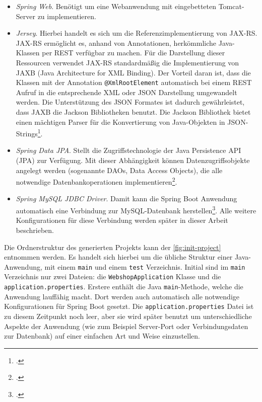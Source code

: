 \begin{itemize}
	\item \textit{Spring Web}. Benötigt um eine Webanwendung mit eingebetteten Tomcat-Server zu implementieren.
	\item \textit{Jersey}. Hierbei handelt es sich um die Referenzimplementierung von JAX-RS. JAX-RS ermöglicht es, anhand von Annotationen, herkömmliche Java-Klassen per REST verfügbar zu machen. Für die Darstellung dieser Ressourcen verwendet JAX-RS standardmäßig die Implementierung von \acs{JAXB} (Java Architecture for XML Binding). Der Vorteil daran ist, dass die Klassen mit der Annotation \texttt{@XmlRootElement} automatisch bei einem REST Aufruf in die entsprechende XML oder \acs{JSON} Darstellung umgewandelt werden. Die Unterstützung des JSON Formates ist dadurch gewährleistet, dass JAXB die Jackson Bibliotheken benutzt. Die Jackson Bibliothek bietet einen mächtigen Parser für die Konvertierung von Java-Objekten in JSON-Strings\footcite[Vgl.][]{Oracle2015}.
	\item \textit{Spring Data JPA}. Stellt die Zugriffstechnologie der Java Persistence API (\acs{JPA}) zur Verfügung. Mit dieser Abhängigkeit können Datenzugriffsobjekte angelegt werden (sogenannte \acs{DAO}s, Data Access Objects), die alle notwendige Datenbankoperationen implementieren\footcite[Vgl.][]{Webb2017}. 
	\item \textit{Spring MySQL JDBC Driver}. Damit kann die Spring Boot Anwendung automatisch eine Verbindung zur MySQL-Datenbank herstellen\footcite[Vgl.][]{Webb2017}. Alle weitere Konfigurationen für diese Verbindung werden später in dieser Arbeit beschrieben.
\end{itemize}

Die Ordnerstruktur des generierten Projekts kann der \cref{fig:init-project} entnommen werden. Es handelt sich hierbei um die übliche Struktur einer Java-Anwendung, mit einem \texttt{main} und einem \texttt{test} Verzeichnis. Initial sind im \texttt{main} Verzeichnis nur zwei Dateien: die \texttt{WebshopApplication} Klasse und die \texttt{application.properties}. Erstere enthält die Java \texttt{main}-Methode, welche die Anwendung lauffähig macht. Dort werden auch automatisch alle notwendige Konfigurationen für Spring Boot gesetzt. Die \texttt{application.properties} Datei ist zu diesem Zeitpunkt noch leer, aber sie wird später benutzt um unterschiedliche Aspekte der Anwendung (wie zum Beispiel Server-Port oder Verbindungsdaten zur Datenbank) auf einer einfachen Art und Weise einzustellen.

